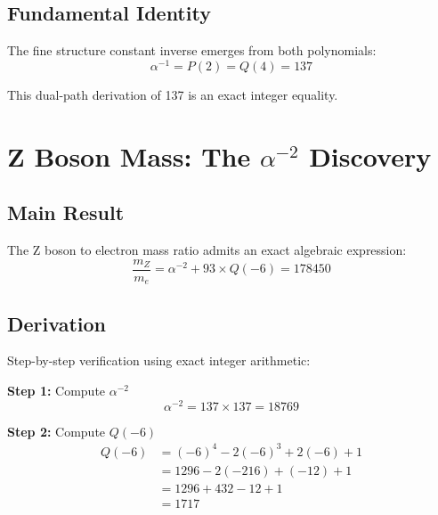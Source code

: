 \documentclass[11pt,a4paper]{article}
\begin{document}
\subsection{Fundamental Identity}

The fine structure constant inverse emerges from both polynomials:
\begin{equation}
\boxed{\alpha^{-1} = P(2) = Q(4) = 137}
\end{equation}

This dual-path derivation of 137 is an exact integer equality.

\section{Z Boson Mass: The $\alpha^{-2}$ Discovery}

\subsection{Main Result}

\begin{theorem}
The Z boson to electron mass ratio admits an exact algebraic expression:
\begin{equation}
\boxed{\frac{m_Z}{m_e} = \alpha^{-2} + 93 \times Q(-6) = 178450}
\end{equation}
\end{theorem}

\subsection{Derivation}

Step-by-step verification using exact integer arithmetic:

\textbf{Step 1:} Compute $\alpha^{-2}$
\begin{equation}
\alpha^{-2} = 137 \times 137 = 18769
\end{equation}

\textbf{Step 2:} Compute $Q(-6)$
\begin{align}
Q(-6) &= (-6)^4 - 2(-6)^3 + 2(-6) + 1 \\
&= 1296 - 2(-216) + (-12) + 1 \\
&= 1296 + 432 - 12 + 1 \\
&= 1717
\end{align}
\end{document}
